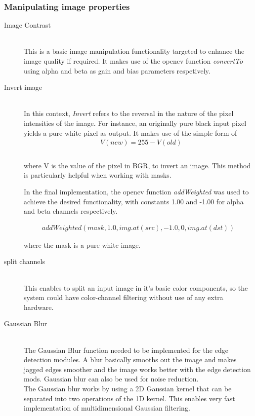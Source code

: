 \subsubsection{Manipulating image properties} 
\begin{description}
\item[Image Contrast]\hfill \\
This is a basic image manipulation functionality targeted to enhance the image quality if required.
It makes use of the opencv function \emph{convertTo} using alpha and beta as gain and bias parameters respetively.

\item[Invert image]\hfill \\
In this context, \emph{Invert} refers to the reversal in the nature of the pixel intensities of the image.
For instance, an originally pure black input pixel yields a pure white pixel as output.
It makes use of the simple form of  
\begin{align*} &V(new) = 255 - V(old) \\ 
\end{align*} 
\\where V is the value of the pixel in BGR, to invert an image. 
This method is particularly helpful when working with masks.

In the final implementation, the opencv function \emph{addWeighted} was used to achieve the desired functionality, with constants 1.00 and -1.00 for alpha and beta channels respectively.

\begin{align*}
addWeighted(mask, 1.0, img.at(src), -1.0, 0, img.at(dst))
\end{align*}

where the mask is a pure white image.

\item[split channels]\hfill \\
This enables to split an input image in it's basic color components, so the system could have color-channel filtering without use of any extra hardware.

\item[Gaussian Blur]\hfill \\
The Gaussian Blur function \cite{web:gaussianBlur}  needed to be implemented for the edge detection modules. A blur basically smooths out the image and makes jagged edges smoother and the image works better with the edge detection mods. Gaussian blur can also be used for noise reduction.
\\The Gaussian blur works by using a 2D Gaussian kernel that can be separated into two operations of the 1D kernel. This enables very fast implementation of multidimensional Gaussian filtering.  


\end{description}
